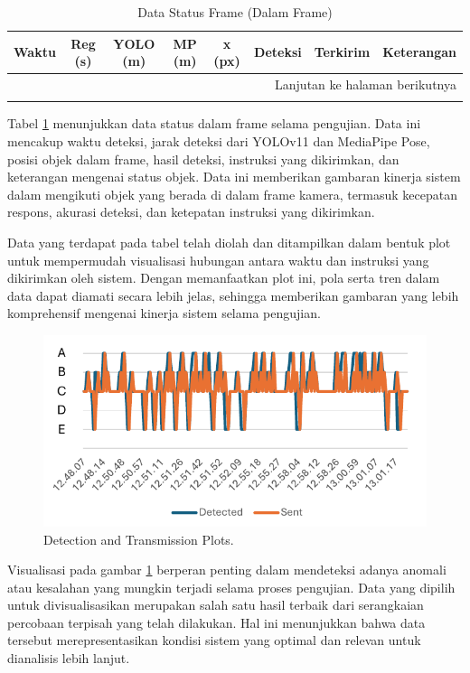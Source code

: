 \begin{longtable}{|c|c|c|c|c|c|c|c|}
    \caption{Data Status Frame (Dalam Frame)} \label{tab:status_dalam_frame} \\
    \hline
    Waktu & Reg (s) & YOLO (m) & MP (m) & x (px) & Deteksi & Terkirim & Keterangan \\ \hline
    \endhead
    \hline \multicolumn{8}{|r|}{Lanjutan ke halaman berikutnya} \\ \hline
    \endfoot
    \endlastfoot
    
\end{longtable}

Tabel \ref{tab:status_dalam_frame} menunjukkan data status dalam frame selama pengujian. Data ini mencakup waktu deteksi, jarak deteksi dari YOLOv11 dan MediaPipe Pose, posisi objek dalam frame, hasil deteksi, instruksi yang dikirimkan, dan keterangan mengenai status objek. Data ini memberikan gambaran kinerja sistem dalam mengikuti objek yang berada di dalam frame kamera, termasuk kecepatan respons, akurasi deteksi, dan ketepatan instruksi yang dikirimkan.

Data yang terdapat pada tabel telah diolah dan ditampilkan dalam bentuk plot untuk mempermudah visualisasi hubungan antara waktu dan instruksi yang dikirimkan oleh sistem. Dengan memanfaatkan plot ini, pola serta tren dalam data dapat diamati secara lebih jelas, sehingga memberikan gambaran yang lebih komprehensif mengenai kinerja sistem selama pengujian.

\begin{figure}[H]
    \centering
    \includegraphics[width=1\textwidth]{gambar/tex/sents.pdf}
    \caption{Detection and Transmission Plots.}
    \label{fig:detection_transmission_plots}
\end{figure}

Visualisasi pada gambar \ref{fig:detection_transmission_plots} berperan penting dalam mendeteksi adanya anomali atau kesalahan yang mungkin terjadi selama proses pengujian. Data yang dipilih untuk divisualisasikan merupakan salah satu hasil terbaik dari serangkaian percobaan terpisah yang telah dilakukan. Hal ini menunjukkan bahwa data tersebut merepresentasikan kondisi sistem yang optimal dan relevan untuk dianalisis lebih lanjut.

